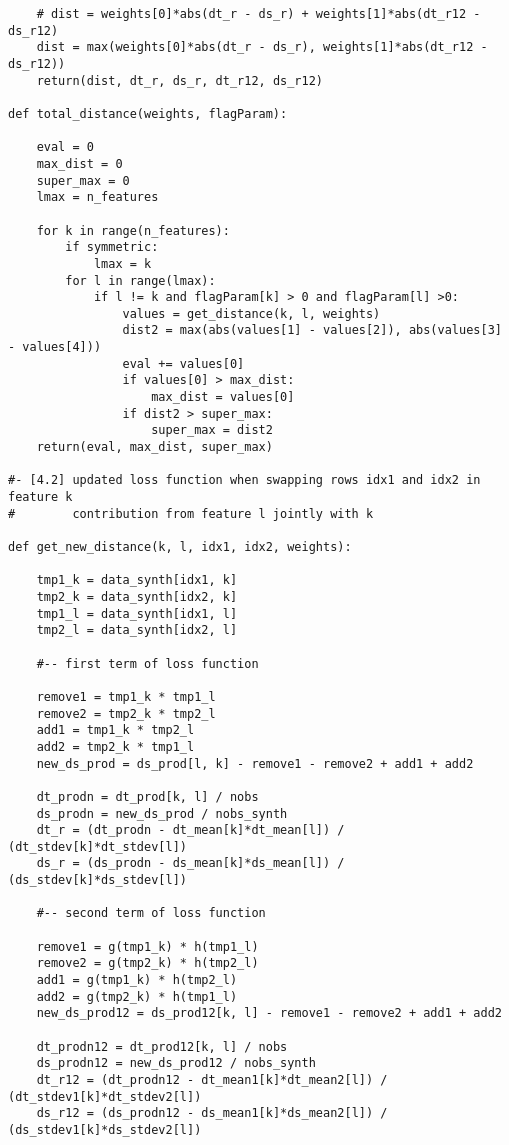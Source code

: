 \documentclass[oneside,10pt]{book}
\begin{document}
\begin{lstlisting}
    # dist = weights[0]*abs(dt_r - ds_r) + weights[1]*abs(dt_r12 - ds_r12) 
    dist = max(weights[0]*abs(dt_r - ds_r), weights[1]*abs(dt_r12 - ds_r12)) 
    return(dist, dt_r, ds_r, dt_r12, ds_r12)
 
def total_distance(weights, flagParam): 

    eval = 0
    max_dist = 0
    super_max = 0
    lmax = n_features

    for k in range(n_features):
        if symmetric:
            lmax = k
        for l in range(lmax):
            if l != k and flagParam[k] > 0 and flagParam[l] >0: 
                values = get_distance(k, l, weights) 
                dist2 = max(abs(values[1] - values[2]), abs(values[3] - values[4]))
                eval += values[0]
                if values[0] > max_dist:
                    max_dist = values[0]
                if dist2 > super_max:
                    super_max = dist2
    return(eval, max_dist, super_max)

#- [4.2] updated loss function when swapping rows idx1 and idx2 in feature k
#        contribution from feature l jointly with k

def get_new_distance(k, l, idx1, idx2, weights):

    tmp1_k = data_synth[idx1, k]
    tmp2_k = data_synth[idx2, k]
    tmp1_l = data_synth[idx1, l]
    tmp2_l = data_synth[idx2, l]

    #-- first term of loss function

    remove1 = tmp1_k * tmp1_l
    remove2 = tmp2_k * tmp2_l
    add1 = tmp1_k * tmp2_l
    add2 = tmp2_k * tmp1_l
    new_ds_prod = ds_prod[l, k] - remove1 - remove2 + add1 + add2 

    dt_prodn = dt_prod[k, l] / nobs   
    ds_prodn = new_ds_prod / nobs_synth
    dt_r = (dt_prodn - dt_mean[k]*dt_mean[l]) / (dt_stdev[k]*dt_stdev[l])
    ds_r = (ds_prodn - ds_mean[k]*ds_mean[l]) / (ds_stdev[k]*ds_stdev[l])

    #-- second term of loss function

    remove1 = g(tmp1_k) * h(tmp1_l)
    remove2 = g(tmp2_k) * h(tmp2_l)
    add1 = g(tmp1_k) * h(tmp2_l)
    add2 = g(tmp2_k) * h(tmp1_l)
    new_ds_prod12 = ds_prod12[k, l] - remove1 - remove2 + add1 + add2       

    dt_prodn12 = dt_prod12[k, l] / nobs         
    ds_prodn12 = new_ds_prod12 / nobs_synth
    dt_r12 = (dt_prodn12 - dt_mean1[k]*dt_mean2[l]) / (dt_stdev1[k]*dt_stdev2[l])
    ds_r12 = (ds_prodn12 - ds_mean1[k]*ds_mean2[l]) / (ds_stdev1[k]*ds_stdev2[l])
 

\end{lstlisting}
\end{document}
